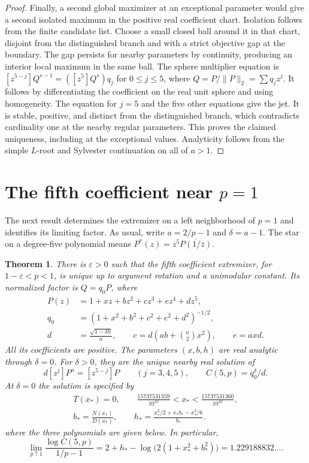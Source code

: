 \documentclass[11pt]{article}
\newtheorem{theorem}{Theorem}
\begin{document}
\begin{proof}
Finally, a second global maximizer at an exceptional parameter
would give a second isolated maximum in the positive real
coefficient chart. Isolation follows from the finite candidate
list. Choose a small closed ball around it in that chart,
disjoint from the distinguished branch and with a strict
objective gap at the boundary. The gap persists for nearby
parameters by continuity, producing an interior local maximum
in the same ball. The sphere multiplier equation is
\([z^{5-j}]Q^{s-1}=([z^5]Q^s)q_j\) for \(0\le j\le 5\),
where \(Q=P/\|P\|_2=\sum q_jz^j\). It follows by differentiating
the coefficient on the real unit sphere and using homogeneity.
The equation for \(j=5\) and the five other equations give the jet. It is
stable, positive, and distinct from the distinguished branch,
which contradicts cardinality one at the nearby regular
parameters. This proves the claimed uniqueness, including at
the exceptional values. Analyticity follows from the simple
\(L\)-root and Sylvester continuation on all of \(a>1\).
\end{proof}

\section{The fifth coefficient near \texorpdfstring{\(p=1\)}{p=1}}

The next result determines the extremizer on a left neighborhood of
\(p=1\) and identifies its limiting factor. As usual, write
\(a=2/p-1\) and \(\delta=a-1\). The star on a degree-five polynomial
means \(P^*(z)=z^5\overline{P(1/\bar z)}\).

\begin{theorem}\label{thm:fifth-near-one}
There is \(\varepsilon>0\) such that the fifth coefficient extremizer,
for \(1-\varepsilon<p<1\), is unique up to argument rotation and a
unimodular constant. Its normalized factor is \(Q=q_0P\), where
\[
 \begin{split}
 P(z)&=1+xz+bz^2+cz^3+ez^4+dz^5,\\
 q_0&=(1+x^2+b^2+c^2+e^2+d^2)^{-1/2},\\
 d&=\frac{\sqrt{1-\delta h}}{a},\qquad
 c=d\left(ab+\binom a2 x^2\right),\qquad e=axd .
 \end{split}
\]
All its coefficients are positive. The parameters \((x,b,h)\) are
real analytic through \(\delta=0\).
For \(\delta>0\), they are the unique nearby real solution of
\[
 d[z^j]P^a=[z^{5-j}]P\qquad (j=3,4,5),
 \qquad C(5,p)=q_0^\delta/d.
\]
At \(\delta=0\) the solution is specified by
\[
 \begin{gathered}T(x_*)=0,\qquad
 \frac{15737531359}{10^{10}}<x_*<
 \frac{15737531360}{10^{10}},\\
 b_*=\frac{N(x_*)}{D(x_*)},\qquad
 h_*=\frac{x_*^2/2+x_*b_*-x_*^3/6}{b_*}.\end{gathered}
\]
where the three polynomials are given below. In particular,
\[
 \lim_{p\uparrow1}\frac{\log C(5,p)}{1/p-1}
   =2+h_*-\log\!\bigl(2(1+x_*^2+b_*^2)\bigr)
   =1.229188832\ldots .
\]
\end{theorem}
\end{document}
